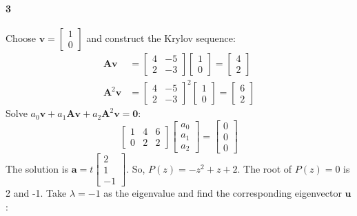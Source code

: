 \documentclass[22pt]{article}
\begin{document}
	\paragraph{3} Choose $\mathbf{v} = \left[\begin{array}{c} 1 \\ 0 \end{array}\right]$ and construct the Krylov sequence: 
	\begin{align}
		\mathbf{Av} & =  \left[\begin{array}{cc} 4&-5 \\ 2&-3 \end{array}\right]\left[\begin{array}{c} 1 \\ 0 \end{array}\right] = \left[\begin{array}{c} 4 \\ 2 \end{array}\right]\\
		\mathbf{A}^2\mathbf{v} & =  \left[\begin{array}{cc} 4&-5 \\ 2&-3 \end{array}\right]^2\left[\begin{array}{c} 1 \\ 0 \end{array}\right] =\left[\begin{array}{c} 6 \\ 2 \end{array}\right]
	\end{align}
	Solve $a_0\mathbf{v}+a_1\mathbf{Av}+a_2\mathbf{A}^2\mathbf{v=0} $:
	\begin{equation}
		 \left[\begin{array}{ccc} 1&4&6 \\ 0&2&2 \end{array}\right]\left[\begin{array}{c} a_0 \\ a_1\\a_2 \end{array}\right] = \left[\begin{array}{c} 0 \\ 0\\0 \end{array}\right]
	\end{equation}
	The solution is $\mathbf{a} = t\left[\begin{array}{c} 2 \\ 1\\-1 \end{array}\right]$. So, $P(z) = -z^2 + z +2$. The root of $P(z) = 0$ is 2 and -1. Take $\lambda = -1$ as the eigenvalue and find the corresponding eigenvector $\mathbf{u}$:
\end{document}
